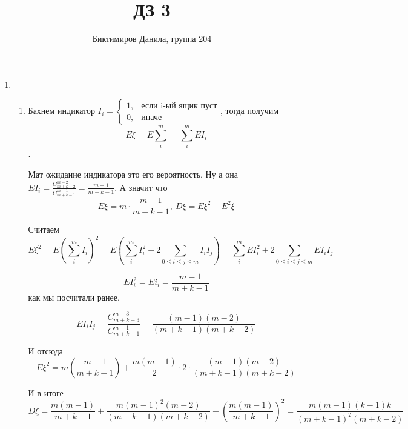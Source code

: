 \documentclass[11pt]{article}
\begin{document}
	
	\author{Биктимиров Данила, группа 204}
	\title{ДЗ 3}
	\date{}
	\maketitle
	
	\medskip
	
	\begin{enumerate}
		
		\item \begin{enumerate}
			\item Бахнем индикатор $I_i=\begin{cases}
				1, &\text{если i-ый ящик пуст}\\
				0, &\text{иначе}
			\end{cases}$, тогда получим $$E\xi=E\sum_{i}^{m}=\sum_{i}^{m}EI_i$$.
			
			Мат ожидание индикатора это его вероятность. Ну а она $EI_i=\frac{C^{m-2}_{m+k-2}}{C^{m-1}_{m+k-1}}=\frac{m-1}{m+k-1}$. А значит что $$E\xi=m\cdot \frac{m-1}{m+k-1}, \:D\xi = E\xi^2-E^2\xi$$
			
			Считаем $$E\xi^2=E(\sum_{i}^{m}I_i)^2=E\left(\sum_{i}^{m}I^2_i + 2\sum_{0\le i\le j\le m}I_iI_j \right)=\sum_{i}^{m}EI^2_i+2\sum_{0\le i\le j\le m}EI_iI_j$$
			
			$$EI^2_i=Ei_i=\frac{m-1}{m+k-1}$$ как мы посчитали ранее.
			
			$$EI_iI_j=\frac{C^{m-3}_{m+k-3}}{C^{m-1}_{m+k-1}}=\frac{(m-1)(m-2)}{(m+k-1)(m+k-2)}$$
			
			И отсюда $$E \xi^2 = m \left(\frac{m - 1}{m + k - 1}\right)+\frac{m(m-1)}{2}\cdot2\cdot\frac{(m-1)(m-2)}{(m+k-1)(m+k-2)}$$
			
			И в итоге $$D\xi = \frac{m(m-1)}{m+k-1}+\frac{m(m-1)^2(m-2)}{(m+k-1)(m+k-2)}-\left(\frac{m(m-1)}{m+k-1}\right)^2 = \frac{m(m-1)(k-1)k}{(m + k- 1)^2(m+k-2)}$$
			

\end{enumerate}
\end{enumerate}
\end{document}
